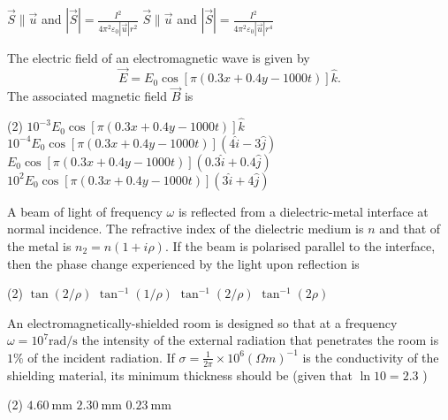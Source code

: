 \begin{enumerate}
\begin{tasks}
	\task[\textbf{C.}]$\vec{S} \| \vec{u}$ and $|\vec{S}|=\frac{I^{2}}{4 \pi^{2} \varepsilon_{0}|\vec{u}| r^{2}}$
	\task[\textbf{D.}]$\vec{S} \| \vec{u}$ and $|\vec{S}|=\frac{I^{2}}{4 \pi^{2} \varepsilon_{0}|\vec{u}| r^{4}}$
\end{tasks}
\begin{minipage}{\textwidth}
	\item The electric field of an electromagnetic wave is given by
	$$
	\vec{E}=E_{0} \cos [\pi(0.3 x+0.4 y-1000 t)] \hat{k} .
	$$
	The associated magnetic field $\vec{B}$ is
\end{minipage}
\begin{tasks}(2)
	\task[\textbf{A.}] $10^{-3} E_{0} \cos [\pi(0.3 x+0.4 y-1000 t)] \hat{k}$
	\task[\textbf{B.}]$10^{-4} E_{0} \cos [\pi(0.3 x+0.4 y-1000 t)](4 \hat{i}-3 \hat{j})$
	\task[\textbf{C.}]$E_{0} \cos [\pi(0.3 x+0.4 y-1000 t)](0.3 \hat{i}+0.4 \hat{j})$
	\task[\textbf{D.}]$10^{2} E_{0} \cos [\pi(0.3 x+0.4 y-1000 t)](3 \hat{i}+4 \hat{j})$
\end{tasks}
\begin{minipage}{\textwidth}
	\item A beam of light of frequency $\omega$ is reflected from a dielectric-metal interface at normal incidence. The refractive index of the dielectric medium is $n$ and that of the metal is $n_{2}=n(1+i \rho)$. If the beam is polarised parallel to the interface, then the phase change experienced by the light upon reflection is
\end{minipage}
\begin{tasks}(2)
	\task[\textbf{A.}] $\tan (2 / \rho)$ 
	\task[\textbf{B.}]$\tan ^{-1}(1 / \rho)$
	\task[\textbf{C.}]$\tan ^{-1}(2 / \rho)$
	\task[\textbf{D.}]$\tan ^{-1}(2 \rho)$
\end{tasks}
\begin{minipage}{\textwidth}
	\item An electromagnetically-shielded room is designed so that at a frequency $\omega=10^{7} \mathrm{rad} / \mathrm{s}$ the intensity of the external radiation that penetrates the room is $1 \%$ of the incident radiation. If $\sigma=\frac{1}{2 \pi} \times 10^{6}(\Omega m)^{-1}$ is the conductivity of the shielding material, its minimum thickness should be (given that $\ln 10=2.3$ )
\end{minipage}
\begin{tasks}(2)
	\task[\textbf{A.}] $4.60 \mathrm{~mm}$
	\task[\textbf{B.}]$2.30 \mathrm{~mm}$
	\task[\textbf{C.}] $0.23 \mathrm{~mm}$

\end{tasks}
\end{enumerate}

